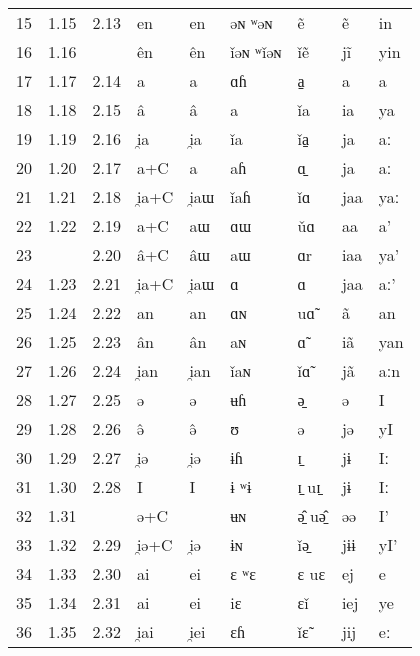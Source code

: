 \documentclass[oldfontcommands,twoside,a4paper,11pt,draft]{memoir}
\newcommand{\ipa}[1]{{\phon #1}} %
\begin{document}
\begin{longtable} {lllllllll}
15&	1.15&	2.13&	\ipa{en}&	\ipa{en}&	\ipa{əɴ ʷəɴ}&	\ipa{ẽ}&	\ipa{ẽ}&	\ipa{in}\\	
16&	1.16&	&	\ipa{ên}&	\ipa{ên}&	\ipa{ǐəɴ ʷǐəɴ}&	\ipa{ǐẽ}&	\ipa{jĩ}&	\ipa{yin}\\	
17&	1.17&	2.14&	\ipa{a}&	\ipa{a}&	\ipa{ɑɦ}&	\ipa{a̠}&	\ipa{a}&	\ipa{a}\\	
18&	1.18&	2.15&	\ipa{â}&	\ipa{â}&	\ipa{a}&	\ipa{ǐa}&	\ipa{ia}&	\ipa{ya}\\	
19&	1.19&	2.16&	\ipa{i̯a}&	\ipa{i̯a}&	\ipa{ǐa}&	\ipa{ǐa̠}&	\ipa{ja}&	\ipa{aː}\\	
20&	1.20&	2.17&	\ipa{a+C}&	\ipa{a}&	\ipa{aɦ}&	\ipa{ɑ̠}&	\ipa{ja}&	\ipa{aː}\\	
21&	1.21&	2.18&	\ipa{i̯a+C}&	\ipa{i̯aɯ}&	\ipa{ǐaɦ}&	\ipa{ǐɑ}&	\ipa{jaa}&	\ipa{yaː}\\	
22&	1.22&	2.19&	\ipa{a+C}&	\ipa{aɯ}&	\ipa{ɑɯ}&	\ipa{ǔɑ}&	\ipa{aa}&	\ipa{a’}\\	
23&	&	2.20&	\ipa{â+C}&	\ipa{âɯ}&	\ipa{aɯ}&	\ipa{ɑr}&	\ipa{iaa}&	\ipa{ya’}\\	
24&	1.23&	2.21&	\ipa{i̯a+C}&	\ipa{i̯aɯ}&	\ipa{ɑ}&	\ipa{ɑ}&	\ipa{jaa}&	\ipa{aː’}\\	
25&	1.24&	2.22&	\ipa{an}&	\ipa{an}&	\ipa{ɑɴ}&	\ipa{uɑ̃}&	\ipa{ã}&	\ipa{an}\\	
26&	1.25&	2.23&	\ipa{ân}&	\ipa{ân}&	\ipa{aɴ}&	\ipa{ɑ̃}&	\ipa{iã}&	\ipa{yan}\\	
27&	1.26&	2.24&	\ipa{i̯an}&	\ipa{i̯an}&	\ipa{ǐaɴ}&	\ipa{ǐɑ̃}&	\ipa{jã}&	\ipa{aːn}\\	
28&	1.27&	2.25&	\ipa{ə}&	\ipa{ə}&	\ipa{ʉɦ}&	\ipa{ə̠}&	\ipa{ə}&	\ipa{I}\\	
29&	1.28&	2.26&	\ipa{ə̂}&	\ipa{ə̂}&	\ipa{ʊ}&	\ipa{ə}&	\ipa{jə}&	\ipa{yI}\\	
30&	1.29&	2.27&	\ipa{i̯ə}&	\ipa{i̯ə}&	\ipa{ɨɦ}&	\ipa{ɪ̠}&	\ipa{jɨ}&	\ipa{Iː}\\	
31&	1.30&	2.28&	\ipa{I}&	\ipa{I}&	\ipa{ɨ ʷɨ}&	\ipa{ɪ̠ uɪ̠}&	\ipa{jɨ}&	\ipa{Iː}\\	
32&	1.31&	&	\ipa{ə+C}&	\ipa{}&	\ipa{ʉɴ}&	\ipa{ə̠̂ uə̠̂}&	\ipa{əə}&	\ipa{I’}\\	
33&	1.32&	2.29&	\ipa{i̯ə+C}&	\ipa{i̯ə}&	\ipa{ɨɴ}&	\ipa{ǐə̠}&	\ipa{jɨɨ}&	\ipa{yI’}\\	
34&	1.33&	2.30&	\ipa{ai}&	\ipa{ei}&	\ipa{ɛ ʷɛ}&	\ipa{ɛ uɛ}&	\ipa{ej}&	\ipa{e}\\	
35&	1.34&	2.31&	\ipa{ai}&	\ipa{ei}&	\ipa{iɛ}&	\ipa{ɛǐ}&	\ipa{iej}&	\ipa{ye}\\	
36&	1.35&	2.32&	\ipa{i̯ai}&	\ipa{i̯ei}&	\ipa{ɛɦ}&	\ipa{ǐɛ̃}&	\ipa{jij}&	\ipa{eː}\\	

\end{longtable}
\end{document}
